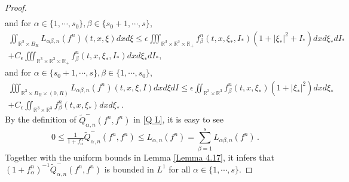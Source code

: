 \documentclass[reqno,11pt]{amsart}
\numberwithin{equation}{section}
\def\R{\mathbb{R}}
\begin{document}
\begin{proof}
\begin{equation*}
{\begin{aligned}
		\end{aligned}}
	\end{equation*}
and for $\alpha \in \{1,\cdots,s_0\} , \beta \in \{s_0+1,\cdots,s\}$,
		\begin{align*}	
			\iint_{\R^3 \times B_R } L_{ \alpha \beta ,n} (f^n) (t,x, \xi) dxd\xi \leq \epsilon \iiint_{\R^3 \times \R^3 \times \R_+} f^n_{\beta} (t,x,\xi_*, I_*) (1+|\xi_*|^2 +I_*) dxd\xi_* dI_* \\
+C_\epsilon \iiint_{\R^3 \times \R^3 \times \R_+} f^n_{\beta} (t,x, \xi_*, I_*) dxd\xi_* dI_*,
		\end{align*}
and for $\alpha \in \{s_0+1,\cdots,s\} , \beta \in \{1,\cdots,s_0\}$,
	\begin{equation*}
		\begin{aligned}	
			\iiint_{\R^3 \times B_R \times (0,R)} L_{ \alpha \beta ,n} (f^n) (t,x, \xi, I) dxd\xi dI \leq \epsilon \iint_{\R^3 \times \R^3 } f^n_{\beta} (t, x, \xi_*) (1+|\xi_*|^2) dxd\xi_* \\
+ C_\epsilon \iint_{\R^3 \times \R^3 } f^n_{\beta} (t,x, \xi_*) dxd\xi_* \,.
		\end{aligned}
	\end{equation*}
By the definition of $\tilde{Q}^- _{\alpha ,n}(f^n,f^n)$ in \eqref{Q L}, it is easy to see          
	\begin{equation}\label{Q-L-bnd}
		0 \leq \tfrac{1}{1+ f^n_\alpha } \tilde{Q}^-_{\alpha ,n} (f^n,f^n) \leq L_{\alpha,n}(f^n) =\sum \limits_{\beta =1}^s L_{\alpha \beta ,n} (f^n) \,.
	\end{equation}	
Together with the uniform bounds in Lemma \ref{Lemma 4.17}, it infers that $(1+ f^n_\alpha )^{-1} \tilde{Q}^- _{\alpha ,n}(f^n,f^n)$ is bounded in $L^1$ for all $\alpha \in \{ 1, \cdots, s \}$. 


\end{proof}
\end{document}
